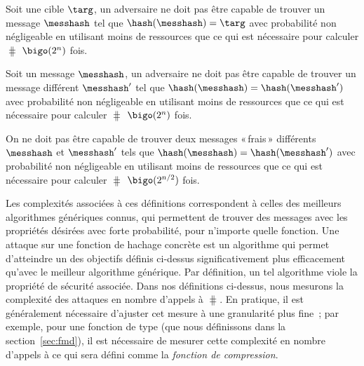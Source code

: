 \begin{fdefi}
Soit une cible $\targ$, un adversaire ne doit pas être capable de trouver un message
$\messhash$ tel que $\hash(\messhash) = \targ$ avec probabilité non négligeable en utilisant moins de ressources que ce qui est nécessaire pour calculer
$\hash$ $\bigo(2^n)$ fois.
\end{fdefi}
\begin{fdefi}
Soit un message $\messhash$, un adversaire ne doit pas être capable de trouver un message différent $\messhash'$ tel que
$\hash(\messhash) = \hash(\messhash')$  avec probabilité non négligeable en utilisant moins de ressources que
ce qui est nécessaire pour calculer $\hash$ $\bigo(2^n)$ fois.
\end{fdefi}
\begin{fdefi} On ne doit pas être capable de trouver deux messages «\,frais\,» différents $\messhash$ et $\messhash'$ tels que $\hash(\messhash) =
\hash(\messhash')$ avec probabilité non négligeable en utilisant moins de ressources que ce qui est nécessaire pour calculer  $\hash$ $\bigo(2^{n/2})$ fois.
\end{fdefi}

Les complexités associées à ces définitions correspondent à celles des meilleurs algorithmes génériques connus, qui permettent de trouver
des messages avec les propriétés désirées avec forte probabilité, pour n'importe quelle fonction.
Une attaque sur une fonction de hachage concrète est un algorithme qui permet d'atteindre un des objectifs définis ci-dessus significativement
plus efficacement qu'avec le meilleur algorithme générique. Par définition, un tel algorithme viole la propriété de sécurité associée.
Dans nos définitions ci-dessus, nous mesurons la complexité des attaques en nombre d'appels à $\hash$. En pratique, il est généralement
nécessaire d'ajuster cet mesure à une granularité plus fine~; par exemple, pour une fonction de type \merkdam (que nous définissons
dans la section~\ref{sec:fmd}), il est nécessaire de mesurer cette complexité en nombre d'appels à ce qui sera défini comme
la \emph{fonction de compression}.


